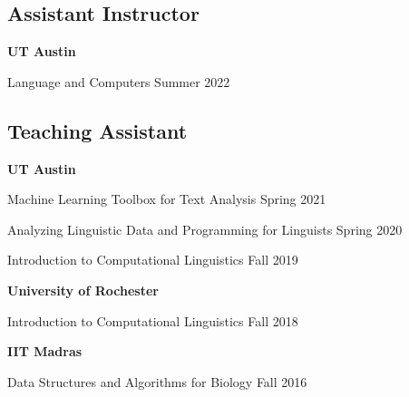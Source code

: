 \subsection{Assistant Instructor}

\textbf{\small UT Austin}

\quad Language and Computers \hfill Summer 2022

\subsection{Teaching Assistant}

\textbf{\small UT Austin}

\quad Machine Learning Toolbox for Text Analysis \hfill Spring 2021

\quad Analyzing Linguistic Data and Programming for Linguists \hfill Spring 2020

\quad Introduction to Computational Linguistics \hfill Fall 2019

\textbf{\small University of Rochester}

\quad Introduction to Computational Linguistics \hfill Fall 2018

\textbf{\small IIT Madras}

\quad Data Structures and Algorithms for Biology \hfill Fall 2016

